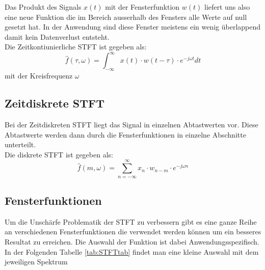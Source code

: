 Das Produkt des Signals $x(t)$ mit der Fensterfunktion $w(t) $ liefert uns also eine neue Funktion die im Bereich ausserhalb des Fensters alle Werte auf null gesetzt hat. In der Anwendung sind diese Fenster meistens ein wenig überlappend damit kein Datenverlust entsteht. \\
Die Zeitkontiunierliche STFT ist  gegeben als:
\begin{equation}
	\hat{f}(\tau, \omega)=\int_{-\infty}^{\infty} x(t)\cdot w(t-\tau)\cdot e^{-j \omega t} dt
\end{equation}
mit der Kreisfrequenz  $\omega $

\subsection{Zeitdiskrete STFT}
Bei der Zeitdiskreten STFT liegt das Signal in einzelnen Abtastwerten vor. Diese Abtastwerte werden dann durch die Fensterfunktionen in einzelne Abschnitte unterteilt. \\
Die diskrete STFT ist gegeben als:
\begin{equation}
	\hat{f}(m, \omega)=\sum_{n=-\infty}^{\infty} x_{n} \cdot w_{n-m}\cdot e^{-j \omega n}
\end{equation}


\subsection{Fensterfunktionen}
Um die Unschärfe Problematik der STFT zu verbessern gibt es eine ganze Reihe an verschiedenen Fensterfunktionen die verwendet werden können um ein besseres Resultat zu erreichen. Die Auswahl der Funktion ist dabei Anwendungsspezifisch. In der Folgenden Tabelle \ref{tab:STFTtab} findet man eine kleine Auswahl mit dem jeweiligen Spektrum 


